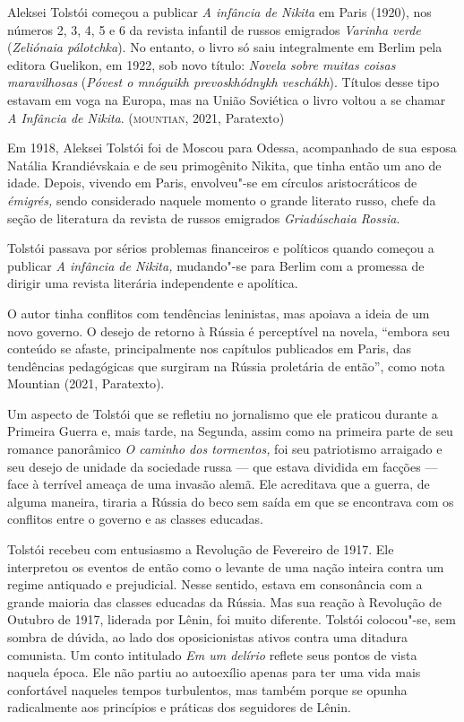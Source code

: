 \documentclass[11pt]{extarticle}
\begin{document}
Aleksei Tolstói começou a publicar \emph{A infância de Nikita} em Paris
(1920), nos números 2, 3, 4, 5 e 6 da revista infantil de russos
emigrados \emph{Varinha verde} (\emph{Zeliónaia pálotchka}). No entanto,
o livro só saiu integralmente em Berlim pela editora Guelikon, em 1922,
sob novo título: \emph{Novela sobre muitas coisas maravilhosas}
(\emph{Póvest o mnóguikh prevoskhódnykh veschákh}). Títulos desse tipo
estavam em voga na Europa, mas na União Soviética o livro voltou a se
chamar \emph{A Infância de Nikita}. (\textsc{mountian}, 2021, Paratexto)

Em 1918, Aleksei Tolstói foi de Moscou para Odessa, acompanhado de sua
esposa Natália Krandiévskaia e de seu primogênito Nikita, que tinha
então um ano de idade. Depois, vivendo em Paris, envolveu"-se em círculos
aristocráticos de \emph{émigrés,} sendo considerado naquele momento o
grande literato russo, chefe da seção de literatura da revista de russos
emigrados \emph{Griadúschaia Rossia}.

Tolstói passava por sérios problemas financeiros e políticos quando
começou a publicar \emph{A infância de Nikita,} mudando"-se para Berlim
com a promessa de dirigir uma revista literária independente e
apolítica.

O autor tinha conflitos com tendências leninistas, mas apoiava a ideia
de um novo governo. O desejo de retorno à Rússia é perceptível na
novela, ``embora seu conteúdo se afaste, principalmente nos capítulos
publicados em Paris, das tendências pedagógicas que surgiram na Rússia
proletária de então'', como nota Mountian (2021, Paratexto).

Um aspecto de Tolstói que se refletiu no jornalismo que ele praticou
durante a Primeira Guerra e, mais tarde, na Segunda, assim como na
primeira parte de seu romance panorâmico \emph{O caminho dos tormentos,}
foi seu patriotismo arraigado e seu desejo de unidade da sociedade russa
--- que estava dividida em facções --- face à terrível ameaça de uma
invasão alemã. Ele acreditava que a guerra, de alguma maneira, tiraria a
Rússia do beco sem saída em que se encontrava com os conflitos entre o
governo e as classes educadas.

Tolstói recebeu com entusiasmo a Revolução de Fevereiro de 1917. Ele
interpretou os eventos de então como o levante de uma nação inteira
contra um regime antiquado e prejudicial. Nesse sentido, estava em
consonância com a grande maioria das classes educadas da Rússia. Mas sua
reação à Revolução de Outubro de 1917, liderada por Lênin, foi muito
diferente. Tolstói colocou"-se, sem sombra de dúvida, ao lado dos
oposicionistas ativos contra uma ditadura comunista. Um conto intitulado
\emph{Em um delírio} reflete seus pontos de vista naquela época. Ele não
partiu ao autoexílio apenas para ter uma vida mais confortável naqueles
tempos turbulentos, mas também porque se opunha radicalmente aos
princípios e práticas dos seguidores de Lênin.
\end{document}
